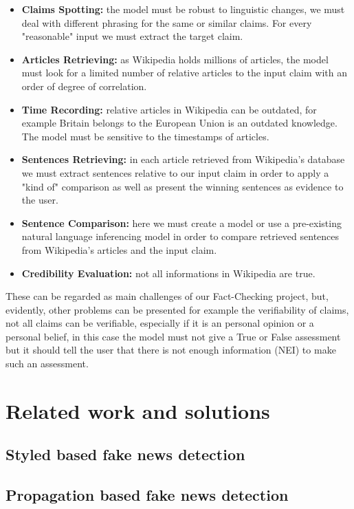 \documentclass[10pt, english]{report}
\begin{document}
\begin{itemize}
	\item \textbf{Claims Spotting:} the model must be robust to linguistic changes, we must deal with different phrasing for the same or similar claims. For every "reasonable" input we must extract the target claim.
	\item \textbf{Articles Retrieving:} as Wikipedia holds millions of articles, the model must look for a limited number of relative articles to the input claim with an order of degree of correlation.
	\item \textbf{Time Recording:} relative articles in Wikipedia can be outdated, for example Britain belongs to the European Union is an outdated knowledge. The model must be sensitive to the timestamps of articles.
	\item \textbf{Sentences Retrieving:}  in each article retrieved from Wikipedia's database we must extract sentences relative to our input claim in order to apply a "kind of" comparison as well as present the winning sentences as evidence to the user.
	\item \textbf{Sentence Comparison:} here we must create a model or use a pre-existing natural language inferencing model in order to compare retrieved sentences from Wikipedia's articles and the input claim. 
	\item \textbf{Credibility Evaluation:} not all informations in Wikipedia are true.
\end{itemize}

These can be regarded as main challenges of our Fact-Checking project, but, evidently, other problems can be presented for example the verifiability of claims, not all claims can be verifiable, especially if it is an personal opinion or a personal belief, in this case the model must not give a True or False assessment but it should tell the user that there is not enough information (NEI) to make such an assessment.

\section{Related work and solutions}
\subsection{Styled based fake news detection}

\subsection{Propagation based fake news detection}
\end{document}
